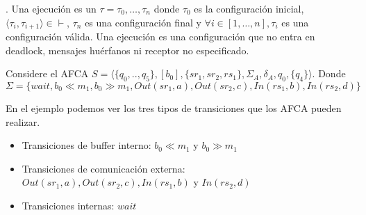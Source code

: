 




\begin{definition}. Una ejecución es un $ \tau = \tau_0, \ldots,\tau_n $ donde $\tau_0$ es la configuración inicial, $\langle \tau_i, \tau_{i+1} \rangle \in \vdash$, $\tau_n$ es una configuración final y $ \forall i \in [1, \ldots, n], \tau_i$ es una configuración válida. Una ejecución es una configuración que no entra en deadlock, mensajes huérfanos ni receptor no especificado.
\end{definition}

\begin{example}
\label{ex:AFCA}
Considere el AFCA $S= \langle \{q_0,..,q_5\},[b_0],\{sr_1,sr_2,rs_1\}, \Sigma_A, \delta_A, q_0, \{q_4\} \rangle$. Donde $\Sigma =\{wait, b_0 \ll m_1,b_0 \gg m_1, Out(sr_1,a),Out(sr_2,c), In(rs_1,b),In(rs_2,d) \}$
\begin{center}
\end{center}
En el ejemplo podemos ver los tres tipos de transiciones que los AFCA pueden realizar. 

\begin{itemize}
    \item Transiciones de buffer interno: $b_0 \ll m_1$ y $b_0 \gg m_1$
    \item Transiciones de comunicación externa: $Out(sr_1,a),Out(sr_2,c), In(rs_1,b)$ y $In(rs_2,d) $
    \item Transiciones internas: $wait$
\end{itemize}
\end{example}

